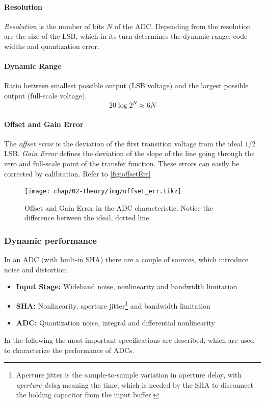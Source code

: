 \paragraph{Resolution}
\textit{Resolution} is the number of bits $N$ of the ADC. Depending from the resolution are the size of the LSB, which in its turn determines the dynamic range, code widths and quantization error.

\paragraph{Dynamic Range}
Ratio between smallest possible output (LSB voltage) and the largest possible output (full-scale voltage).
\begin{equation}
	20 \log 2^{N} \approx 6N
\end{equation}


\paragraph{Offset and Gain Error}
The \textit{offset error} is the deviation of the first transition voltage from the ideal $1/2$ LSB. \textit{Gain Error} defines the deviation of the slope of the line going through the zero and full-scale point of the transfer function. These errors can easily be corrected by calibration. Refer to \autoref{fig:offsetErr}

\begin{figure}[H]
	\centering
	\texttt{[image: chap/02-theory/img/offset\_err.tikz]}
	\caption{Offset and Gain Error in the ADC characteristic. Notice the difference between the ideal, dotted line}
	\label{fig:offsetErr}
\end{figure}

\subsubsection*{Dynamic performance}
In an ADC (with built-in SHA) there are a couple of sources, which introduce noise and distortion:
\begin{itemize}
	\item \textbf{Input Stage:} Wideband noise, nonlinearity and bandwidth limitation
	\item \textbf{SHA:} Nonlinearity, aperture jitter\footnote{Aperture jitter is the sample-to-sample variation in aperture delay, with \textit{aperture delay} meaning the time, which is needed by the SHA to disconnect the holding capacitor from the input buffer.} and bandwidth limitation
	\item \textbf{ADC:} Quantization noise, integral and differential nonlinearity
\end{itemize}
In the following the most important specifications are described, which are used to characterize the performance of ADCs.

